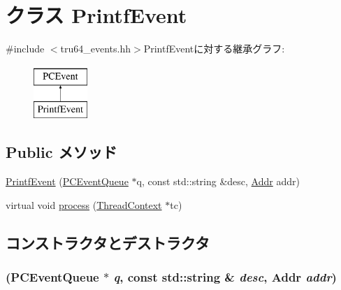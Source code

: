 \hypertarget{classPrintfEvent}{
\section{クラス PrintfEvent}
\label{classPrintfEvent}
}


{\ttfamily \#include $<$tru64\_\-events.hh$>$}PrintfEventに対する継承グラフ:\begin{figure}[H]
\begin{center}
\leavevmode
\includegraphics[height=2cm]{classPrintfEvent}
\end{center}
\end{figure}
\subsection*{Public メソッド}
\begin{DoxyCompactItemize}
\item 
\hyperlink{classPrintfEvent_a22b8510e7b284268529b64a3c400d303}{PrintfEvent} (\hyperlink{classPCEventQueue}{PCEventQueue} $\ast$q, const std::string \&desc, \hyperlink{base_2types_8hh_af1bb03d6a4ee096394a6749f0a169232}{Addr} addr)
\item 
virtual void \hyperlink{classPrintfEvent_ad66a9d5ec7cfe597b848a17c0df5cc28}{process} (\hyperlink{classThreadContext}{ThreadContext} $\ast$tc)
\end{DoxyCompactItemize}


\subsection{コンストラクタとデストラクタ}
\hypertarget{classPrintfEvent_a22b8510e7b284268529b64a3c400d303}{
\subsubsection[{PrintfEvent}]{ ({\bf PCEventQueue} $\ast$ {\em q}, \/  const std::string \& {\em desc}, \/  {\bf Addr} {\em addr})}}
\label{classPrintfEvent_a22b8510e7b284268529b64a3c400d303}



